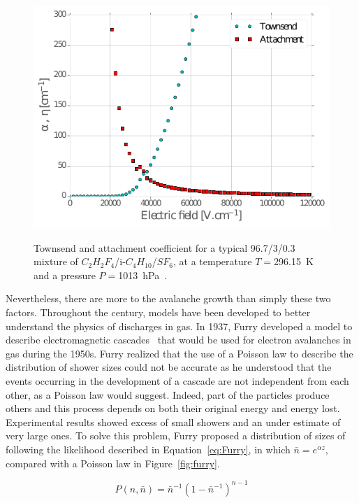 	\begin{figure}[H]
		\centering
		\includegraphics[width = 0.7\plotwidth]{fig/chapt4/Townsend-RPC.pdf}\\
		\caption{\label{fig:Townsend} Townsend and attachment coefficient for a typical 96.7/3/0.3 mixture of $C_2H_2F_4$/i-$C_4H_{10}$/$SF_6$, at a temperature $T=$\SI{296.15}{K} and a pressure $P=$\SI{1013}{hPa}~\cite{VINCENT2017,RIEGLER2003}.}
	\end{figure}
	
	Nevertheless, there are more to the avalanche growth than simply these two factors. Throughout the  century, models have been developed to better understand the physics of discharges in gas. In 1937, Furry developed a model to describe electromagnetic cascades~\cite{FURRY1937} that would be used for electron avalanches in gas during the 1950s. Furry realized that the use of a Poisson law to describe the distribution of shower sizes could not be accurate as he understood that the events occurring in the development of a cascade are not independent from each other, as a Poisson law would suggest. Indeed, part of the particles produce others and this process depends on both their original energy and energy lost. Experimental results showed excess of small showers and an under estimate of very large ones. To solve this problem, Furry proposed a distribution of sizes of following the likelihood described in Equation~\ref{eq:Furry}, in which $\bar{n} = e^{\alpha z}$, compared with a Poisson law in Figure~\ref{fig:furry}.
	
	\begin{equation}
	\label{eq:Furry}
	P(n,\bar{n}) = \bar{n}^{-1} (1-\bar{n}^{-1})^{n-1}
	\end{equation}
	

